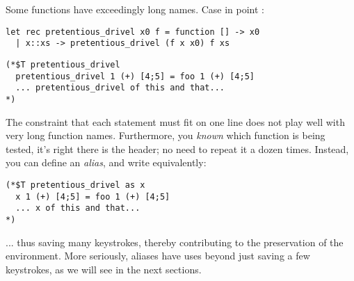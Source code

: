 
Some functions have exceedingly long names. Case in point :

\begin{verbatim}
let rec pretentious_drivel x0 f = function [] -> x0
  | x::xs -> pretentious_drivel (f x x0) f xs
\end{verbatim}

\begin{verbatim}
(*$T pretentious_drivel
  pretentious_drivel 1 (+) [4;5] = foo 1 (+) [4;5]
  ... pretentious_drivel of this and that...
*)
\end{verbatim}

The constraint that each statement must fit on one line does not play well with very long
function names. Furthermore, you \emph{known} which function is being tested, it's right there
is the header; no need to repeat it a dozen times. Instead, you can define an \emph{alias}, and
write equivalently:

\begin{verbatim}
(*$T pretentious_drivel as x
  x 1 (+) [4;5] = foo 1 (+) [4;5]
  ... x of this and that...
*)
\end{verbatim}

... thus saving many keystrokes, thereby contributing to the preservation of the
environment. More seriously, aliases have uses beyond just saving a few keystrokes, as we
will see in the next sections.